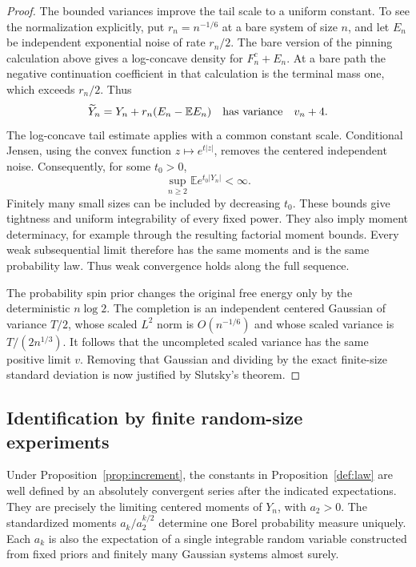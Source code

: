 \begin{proof}
The bounded variances improve the tail scale to a uniform constant.
To see the normalization explicitly, put \(r_n=n^{-1/6}\) at a bare
system of size \(n\), and let \(E_n\) be independent exponential
noise of rate \(r_n/2\). The bare version of the pinning calculation
above gives a log-concave density for \(F_n^c+E_n\). At a bare path
the negative continuation coefficient in that calculation is the
terminal mass one, which exceeds \(r_n/2\). Thus
\[
 \widetilde Y_n=Y_n+r_n(E_n-\mathbb E E_n)
 \quad\hbox{has variance}\quad v_n+4.
\]
The log-concave tail estimate applies with a common constant scale.
Conditional Jensen, using the convex function
\(z\mapsto e^{t|z|}\), removes the centered independent noise.
Consequently, for some \(t_0>0\),
\[
 \sup_{n\ge2}\mathbb E e^{t_0|Y_n|}<\infty.
\]
Finitely many small sizes can be included by decreasing \(t_0\).
These bounds give tightness and uniform integrability of every fixed
power. They also imply moment determinacy, for example through the
resulting factorial moment bounds. Every weak subsequential limit
therefore has the same moments and is the same probability law.
Thus weak convergence holds along the full sequence.

The probability spin prior changes the original free energy only by
the deterministic \(n\log2\). The completion is an independent
centered Gaussian of variance \(T/2\), whose scaled \(L^2\) norm is
\(O(n^{-1/6})\) and whose scaled variance is \(T/(2n^{1/3})\).
It follows that the uncompleted scaled variance has the same positive
limit \(v\). Removing that Gaussian and dividing by the exact
finite-size standard deviation is now justified by Slutsky's theorem.
\end{proof}

\subsection{Identification by finite random-size experiments}

\begin{proposition}\label{red:prop-identification}
Under Proposition~\ref{prop:increment}, the constants in
Proposition~\ref{def:law} are well defined by an absolutely convergent
series after the indicated expectations. They are precisely the
limiting centered moments of \(Y_n\), with \(a_2>0\).
The standardized moments \(a_k/a_2^{k/2}\) determine one Borel
probability measure uniquely. Each \(a_k\) is also the expectation of
a single integrable random variable constructed from fixed priors and
finitely many Gaussian systems almost surely.
\end{proposition}


